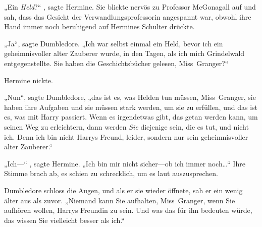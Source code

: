 „Ein \emph{Held}?“ , sagte Hermine. Sie blickte nervös zu Professor McGonagall auf und sah, dass das Gesicht der Verwandlungsprofessorin angespannt war, obwohl ihre Hand immer noch beruhigend auf Hermines Schulter drückte.

„Ja“, sagte Dumbledore. „Ich war selbst einmal ein Held, bevor ich ein geheimnisvoller alter Zauberer wurde, in den Tagen, als ich mich Grindelwald entgegenstellte. Sie haben die Geschichtsbücher gelesen, Miss~Granger?“

Hermine nickte.

„Nun“, sagte Dumbledore, „das ist es, was Helden tun müssen, Miss~Granger, sie haben ihre Aufgaben und sie müssen stark werden, um sie zu erfüllen, und das ist es, was mit Harry passiert. Wenn es irgendetwas gibt, das getan werden kann, um seinen Weg zu erleichtern, dann werden \emph{Sie} diejenige sein, die es tut, und nicht ich. Denn ich bin nicht Harrys Freund, leider, sondern nur sein geheimnisvoller alter Zauberer.“

„Ich—“ , sagte Hermine. „Ich bin mir nicht sicher—ob ich immer noch…“ Ihre Stimme brach ab, es schien zu schrecklich, um es laut auszusprechen.

Dumbledore schloss die Augen, und als er sie wieder öffnete, sah er ein wenig älter aus als zuvor. „Niemand kann Sie aufhalten, Miss~Granger, wenn Sie aufhören wollen, Harrys Freundin zu sein. Und was das für ihn bedeuten würde, das wissen Sie vielleicht besser als ich.“

